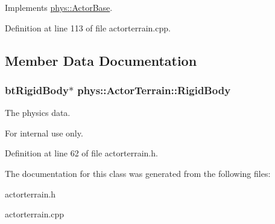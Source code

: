 Implements \hyperlink{classphys_1_1ActorBase_aaa787de7ec5d7d1d8428ea78f37bcb40}{phys::ActorBase}.



Definition at line 113 of file actorterrain.cpp.



\subsection{Member Data Documentation}
\hypertarget{classphys_1_1ActorTerrain_a86b22aad61a7ffceb5c757ddcbca48c3}{
\subsubsection[{RigidBody}]{\setlength{\rightskip}{0pt plus 5cm}btRigidBody$\ast$ {\bf phys::ActorTerrain::RigidBody}}}
\label{de/d74/classphys_1_1ActorTerrain_a86b22aad61a7ffceb5c757ddcbca48c3}


The physics data. 

\begin{DoxyInternal}{For internal use only.}
\end{DoxyInternal}


Definition at line 62 of file actorterrain.h.



The documentation for this class was generated from the following files:\begin{DoxyCompactItemize}
\item 
actorterrain.h\item 
actorterrain.cpp\end{DoxyCompactItemize}
